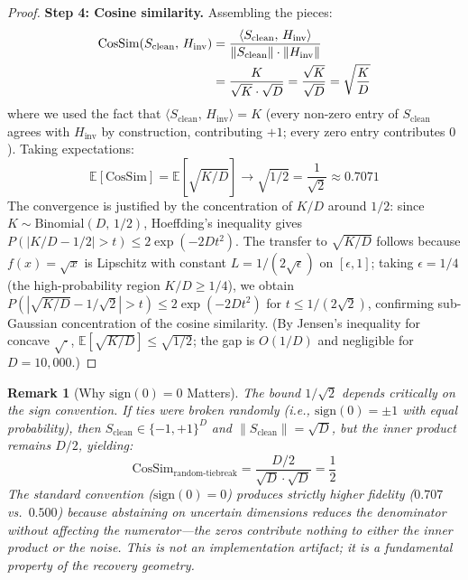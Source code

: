 \documentclass[a4paper,11pt]{article}
\newtheorem{remark}{Remark}
\begin{document}
\begin{proof}
\textbf{Step 4: Cosine similarity.}
Assembling the pieces:
\begin{align}
    \text{CosSim}(S_{\text{clean}},\, H_{\text{inv}}) &= \frac{\langle S_{\text{clean}},\, H_{\text{inv}} \rangle}{\|S_{\text{clean}}\| \cdot \|H_{\text{inv}}\|} \notag \\
    &= \frac{K}{\sqrt{K} \cdot \sqrt{D}} = \frac{\sqrt{K}}{\sqrt{D}} = \sqrt{\frac{K}{D}}
    \label{eq:cosine_derivation}
\end{align}
where we used the fact that $\langle S_{\text{clean}},\, H_{\text{inv}} \rangle = K$ (every non-zero entry of $S_{\text{clean}}$ agrees with $H_{\text{inv}}$ by construction, contributing $+1$; every zero entry contributes $0$). Taking expectations:
\begin{equation}
    \mathbb{E}\!\left[\text{CosSim}\right] = \mathbb{E}\!\left[\sqrt{K/D}\right] \to \sqrt{1/2} = \frac{1}{\sqrt{2}} \approx 0.7071
    \label{eq:final_bound}
\end{equation}
The convergence is justified by the concentration of $K/D$ around $1/2$: since $K \sim \text{Binomial}(D,\, 1/2)$, Hoeffding's inequality \cite{hoeffding1963} gives $P(|K/D - 1/2| > t) \leq 2\exp(-2Dt^2)$. The transfer to $\sqrt{K/D}$ follows because $f(x) = \sqrt{x}$ is Lipschitz with constant $L = 1/(2\sqrt{\epsilon})$ on $[\epsilon, 1]$; taking $\epsilon = 1/4$ (the high-probability region $K/D \geq 1/4$), we obtain $P(|\sqrt{K/D} - 1/\sqrt{2}| > t) \leq 2\exp(-2D t^2)$ for $t \leq 1/(2\sqrt{2})$, confirming sub-Gaussian concentration of the cosine similarity. (By Jensen's inequality for concave $\sqrt{\cdot}$, $\mathbb{E}[\sqrt{K/D}] \leq \sqrt{1/2}$; the gap is $O(1/D)$ and negligible for $D = 10{,}000$.)
\end{proof}

\begin{remark}[Why $\text{sign}(0) = 0$ Matters]
\label{rem:sign_convention}
The bound $1/\sqrt{2}$ depends critically on the sign convention. If ties were broken randomly (i.e., $\text{sign}(0) = \pm 1$ with equal probability), then $S_{\text{clean}} \in \{-1,+1\}^D$ and $\|S_{\text{clean}}\| = \sqrt{D}$, but the inner product remains $D/2$, yielding:
\[
    \text{CosSim}_{\text{random-tiebreak}} = \frac{D/2}{\sqrt{D} \cdot \sqrt{D}} = \frac{1}{2}
\]
The standard convention ($\text{sign}(0) = 0$) produces strictly higher fidelity ($0.707$ vs.\ $0.500$) because abstaining on uncertain dimensions \textit{reduces the denominator} without affecting the numerator---the zeros contribute nothing to either the inner product or the noise. This is not an implementation artifact; it is a fundamental property of the recovery geometry.
\end{remark}
\end{document}
